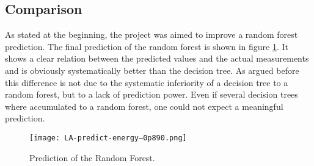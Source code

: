 \documentclass[conference]{IEEEtran}
\begin{document}
\begin{figure*}[!t]
\centerline{
\hfil
{}}
\caption{Analysis of the lowest final MSE of all runs.}
\label{fig:winner}
\end{figure*}


\begin{figure*}[!t]
\centerline{
\hfil
{}}
\caption{Analysis of the lowest predicted MSE of all runs.}
\label{fig:best}
\end{figure*}

\subsection{Comparison}
As stated at the beginning, the project was aimed to improve a random forest prediction. The final prediction of the random forest is shown in figure \ref{fig:random_forest}. It shows a clear relation between the predicted values and the actual measurements and is obviously systematically better than the decision tree. As argued before this difference is not due to the systematic inferiority of a decision tree to a random forest, but to a lack of prediction power. Even if several decision trees where accumulated to a random forest, one could not expect a meaningful prediction.

\begin{figure}[!t] 
\centering 
\texttt{[image: LA-predict-energy--0p890.png]} 
\caption{Prediction of the Random Forest.} 
\label{fig:random_forest} 
\end{figure}




\end{document}
